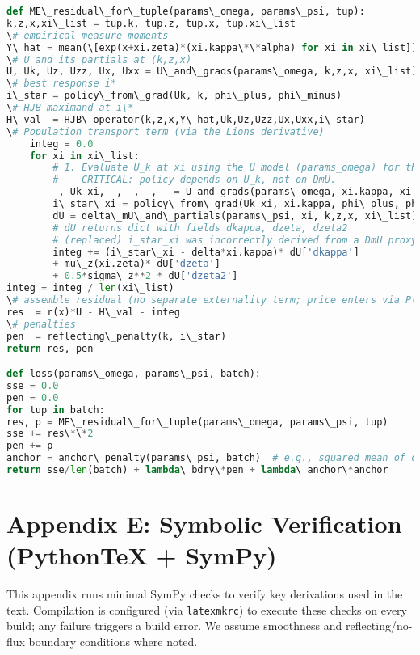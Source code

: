 ﻿\documentclass[11pt,letterpaper,oneside]{article}
\numberwithin{equation}{section}
\newcommand{\1}{\mathbf{1}}
\begin{document}
\begin{lstlisting}[language=Python,caption={Pseudo-JAX for (ME) residual with empirical measure}]
def ME\_residual\_for\_tuple(params\_omega, params\_psi, tup):
k,z,x,xi\_list = tup.k, tup.z, tup.x, tup.xi\_list
\# empirical measure moments
Y\_hat = mean(\[exp(x+xi.zeta)*(xi.kappa\*\*alpha) for xi in xi\_list])
\# U and its partials at (k,z,x)
U, Uk, Uz, Uzz, Ux, Uxx = U\_and\_grads(params\_omega, k,z,x, xi\_list)
\# best response i*
i\_star = policy\_from\_grad(Uk, k, phi\_plus, phi\_minus)
\# HJB maximand at i\*
H\_val  = HJB\_operator(k,z,x,Y\_hat,Uk,Uz,Uzz,Ux,Uxx,i\_star)
\# Population transport term (via the Lions derivative)
    integ = 0.0
    for xi in xi\_list:
        # 1. Evaluate U_k at xi using the U model (params_omega) for the policy i*(xi).
        #    CRITICAL: policy depends on U_k, not on DmU.
        _, Uk_xi, _, _, _, _ = U_and_grads(params\_omega, xi.kappa, xi.zeta, x, xi\_list)
        i\_star\_xi = policy\_from\_grad(Uk_xi, xi.kappa, phi\_plus, phi\_minus)
        dU = delta\_mU\_and\_partials(params\_psi, xi, k,z,x, xi\_list)
        # dU returns dict with fields dkappa, dzeta, dzeta2
        # (replaced) i_star_xi was incorrectly derived from a DmU proxy gradient.
        integ += (i\_star\_xi - delta*xi.kappa)* dU['dkappa'] 
        + mu\_z(xi.zeta)* dU['dzeta'] 
        + 0.5*sigma\_z**2 * dU['dzeta2']
integ = integ / len(xi\_list)
\# assemble residual (no separate externality term; price enters via P(Yhat) in HJB)
res  = r(x)*U - H\_val - integ
\# penalties
pen  = reflecting\_penalty(k, i\_star)
return res, pen

def loss(params\_omega, params\_psi, batch):
sse = 0.0
pen = 0.0
for tup in batch:
res, p = ME\_residual\_for\_tuple(params\_omega, params\_psi, tup)
sse += res\*\*2
pen += p
anchor = anchor\_penalty(params\_psi, batch)  # e.g., squared mean of dmU over batch
return sse/len(batch) + lambda\_bdry\*pen + lambda\_anchor\*anchor
\end{lstlisting}

\section{Appendix E: Symbolic Verification (PythonTeX + SymPy)}\label{app:verification}

\noindent This appendix runs minimal SymPy checks to verify key derivations used in the text. Compilation is configured (via \texttt{latexmkrc}) to execute these checks on every build; any failure triggers a build error. We assume smoothness and reflecting/no-flux boundary conditions where noted.
\end{document}
